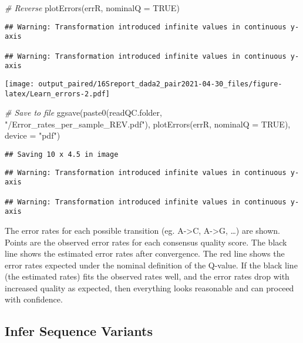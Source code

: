 \documentclass[
]{article}
\newenvironment{Shaded}{\begin{snugshade}}{\end{snugshade}}
\newcommand{\AttributeTok}[1]{\textcolor[rgb]{0.77,0.63,0.00}{#1}}
\newcommand{\CommentTok}[1]{\textcolor[rgb]{0.56,0.35,0.01}{\textit{#1}}}
\newcommand{\ConstantTok}[1]{\textcolor[rgb]{0.00,0.00,0.00}{#1}}
\newcommand{\FunctionTok}[1]{\textcolor[rgb]{0.00,0.00,0.00}{#1}}
\newcommand{\NormalTok}[1]{#1}
\newcommand{\StringTok}[1]{\textcolor[rgb]{0.31,0.60,0.02}{#1}}
\begin{document}
\begin{Shaded}
\begin{Highlighting}[]
\CommentTok{\# Reverse}
\FunctionTok{plotErrors}\NormalTok{(errR, }\AttributeTok{nominalQ =} \ConstantTok{TRUE}\NormalTok{)}
\end{Highlighting}
\end{Shaded}

\begin{verbatim}
## Warning: Transformation introduced infinite values in continuous y-axis

## Warning: Transformation introduced infinite values in continuous y-axis
\end{verbatim}

\texttt{[image: output\_paired/16Sreport\_dada2\_pair2021-04-30\_files/figure-latex/Learn\_errors-2.pdf]}

\begin{Shaded}
\begin{Highlighting}[]
\CommentTok{\# Save to file}
\FunctionTok{ggsave}\NormalTok{(}\FunctionTok{paste0}\NormalTok{(readQC.folder, }\StringTok{"/Error\_rates\_per\_sample\_REV.pdf"}\NormalTok{), }
    \FunctionTok{plotErrors}\NormalTok{(errR, }\AttributeTok{nominalQ =} \ConstantTok{TRUE}\NormalTok{), }\AttributeTok{device =} \StringTok{"pdf"}\NormalTok{)}
\end{Highlighting}
\end{Shaded}

\begin{verbatim}
## Saving 10 x 4.5 in image
\end{verbatim}

\begin{verbatim}
## Warning: Transformation introduced infinite values in continuous y-axis

## Warning: Transformation introduced infinite values in continuous y-axis
\end{verbatim}

The error rates for each possible transition (eg. A-\textgreater C,
A-\textgreater G, \ldots) are shown. Points are the observed error rates
for each consensus quality score. The black line shows the estimated
error rates after convergence. The red line shows the error rates
expected under the nominal definition of the Q-value. If the black line
(the estimated rates) fits the observed rates well, and the error rates
drop with increased quality as expected, then everything looks
reasonable and can proceed with confidence.

\hypertarget{infer-sequence-variants}{%
\subsection{Infer Sequence Variants}\label{infer-sequence-variants}}
\end{document}
